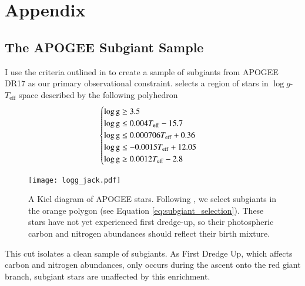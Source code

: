 \documentclass[12pt,oneside]{report}
\begin{document}


\appendix
\chapter*{Appendix}
\renewcommand{\thesection}{A.\arabic{section}}
\renewcommand\thefigure{A\arabic{figure}}    
\renewcommand\theequation{A\arabic{equation}}    
\setcounter{figure}{0}
\setcounter{equation}{0}



\section{The APOGEE Subgiant Sample}\label{sec:jack}

I use the criteria outlined in \cite{jack_subgiant} to create a sample of subgiants from APOGEE DR17 \cite{apogee17} as our primary observational constraint. 
\cite{jack_subgiant} selects a region of stars in $\log g$-$T_\text{eff}$ space described by the following polyhedron
\begin{equation}
    \begin{cases} \label{eq:subgiant_selection}
        \log \text{g} \geq 3.5 \\
        \log \text{g} \leq 0.004T_{\rm eff} - 15.7 \\
        \log \text{g} \leq 0.000706T_{\rm eff} + 0.36 \\
        \log \text{g} \leq -0.0015T_{\rm eff} + 12.05 \\
        \log \text{g} \geq 0.0012T_{\rm eff} - 2.8 \\
    \end{cases}
\end{equation}

\begin{figure}
    \centering
    \texttt{[image: logg\_jack.pdf]}
    \caption[Subgiant selection]{
        A Kiel diagram of APOGEE stars. Following \citet{jack_subgiant}, we select subgiants in the orange polygon (see Equation \ref{eq:subgiant_selection}). These stars have not yet experienced first dredge-up, so their photospheric carbon and nitrogen abundances should reflect their birth mixture.
    }
\end{figure}

This cut isolates a clean sample of subgiants. As First Dredge Up, which affects carbon and nitrogen abundances, only occurs during the ascent onto the red giant branch, subgiant stars are unaffected by this enrichment. 
\end{document}
